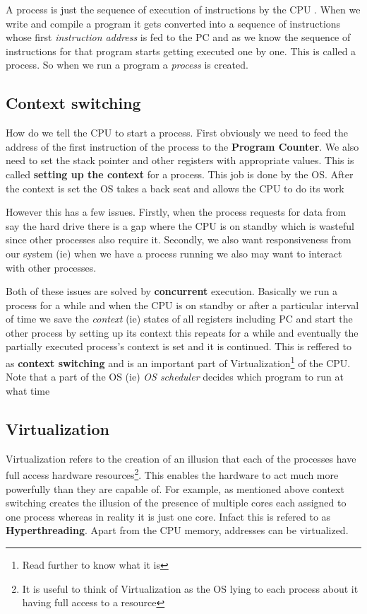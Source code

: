 \documentclass[12pt]{article}
\begin{document}
\noindent A process is just the sequence of execution of instructions by the CPU
. When we write and compile a program it gets converted into a sequence of instructions whose first \textit{instruction address} is fed to the PC and as we know 
the sequence of instructions for that program starts getting executed one by one. This is called a process. So when we run a program a \textit{process} is created.


\subsection{Context switching}
\label{section:context}
How do we tell the CPU to start a process. First obviously we need to feed the address of the first instruction of the process to the \textbf{Program Counter}. We also need to set 
the stack pointer and other registers with appropriate values. This is called \textbf{setting up the context} for a process. This job is done by the OS. After the context is set the OS takes a back seat and allows the CPU to do its work


\noindent However this has a few issues. Firstly, when the process requests for data from say the hard drive there is a gap where the CPU 
is on standby which is wasteful since other processes also require it. Secondly, we also want responsiveness from our system (ie) when
we have a process running we also may want to interact with other processes. 


Both of these issues are solved by \textbf{concurrent} execution. Basically we run a process for a while and when the CPU is on standby or after a 
particular interval of time we save the \textit{context} (ie) states of all registers including PC and start the other process by setting up its context this repeats
for a while and eventually the partially executed process's context is set and it is continued.
This is reffered to as \textbf{context switching} and is an important part of Virtualization\footnote{Read further to know what it is} of the CPU.
Note that a part of the OS (ie) \textit{OS scheduler} decides which program to run at what time

\subsection{Virtualization}
Virtualization refers to the creation of an illusion that each of the processes have full access hardware resources\footnote{It is useful to think of Virtualization as the OS lying to each process about it having full access to a resource}. This
enables the hardware to act much more powerfully than they are capable of. For example, as mentioned above context switching creates the illusion
of the presence of multiple cores each assigned to one process whereas in reality it is just one core.
Infact this is refered to as \textbf{Hyperthreading}. Apart from the CPU memory, addresses can be virtualized.
\end{document}

